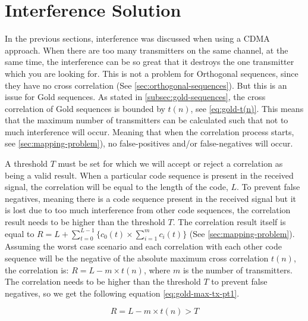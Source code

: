 
\section{Interference Solution}
\label{sec:interference-solution}

In the previous sections, interference was discussed when using a CDMA approach.
When there are too many transmitters on the same channel, at the same time, the interference can be so great that it destroys the one transmitter which you are looking for.
This is not a problem for Orthogonal sequences, since they have no cross correlation (See \autoref{sec:orthogonal-sequences}).
But this is an issue for Gold sequences. 
As stated in \autoref{subsec:gold-sequences}, the cross correlation of Gold sequences is bounded by $t(n)$, see \autoref{eq:gold-t(n)}.
This means that the maximum number of transmitters can be calculated such that not to much interference will occur. 
Meaning that when the correlation process starts, see \autoref{sec:mapping-problem}), no false-positives and/or false-negatives will occur.


A threshold $T$ must be set for which we will accept or reject a correlation as being a valid result.
When a particular code sequence is present in the received signal, the correlation will be equal to the length of the code, $L$.
To prevent false negatives, meaning there is a code sequence present in the received signal but it is lost due to too much interference from other code sequences, the correlation result needs to be higher than the threshold $T$.
The correlation result itself is equal to $R = L + \displaystyle\sum_{t = 0} ^ {L - 1} \Bigg\{ c_0(t) \times  \displaystyle\sum_{i = 1} ^ {m} c_i(t) \Bigg\} $ (See \autoref{sec:mapping-problem}).
Assuming the worst case scenario and each correlation with each other code sequence will be the negative of the absolute maximum cross correlation $t(n)$, the correlation is: $R = L - m \times t(n)$, where $m$ is the number of transmitters.
The correlation needs to be higher than the threshold $T$ to prevent false negatives, so we get the following equation \autoref{eq:gold-max-tx-pt1}.

\begin{equation}
	\label{eq:gold-max-tx-pt1}
	R = L - m \times t(n) > T
\end{equation}

